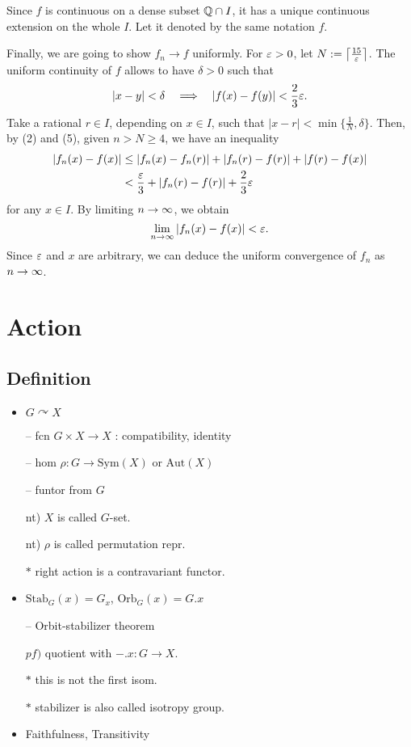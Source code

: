 \documentclass[11pt]{article}
\let\realsection\section
\renewcommand\section{\newpage\realsection}
\begin{document}
\begin{pf}
Since $f$ is continuous on a dense subset $\mathbb{Q}\cap I$, it has a unique continuous extension on the whole $I$.
Let it denoted by the same notation $f$.

\Step[4]
Finally, we are going to show $f_n\to f$ uniformly.
For $\varepsilon>0$, let $N:=\left\lceil\frac{15}{\varepsilon}\right\rceil$.
The uniform continuity of $f$ allows to have $\delta>0$ such that
\begin{align}|x-y|<\delta\impl|f(x)-f(y)|<\frac23\e.\end{align}
Take a rational $r\in I$, depending on $x\in I$, such that $|x-r|<\min\{\frac1N,\delta\}$.
Then, by (2) and (5), given $n>N\ge4$, we have an inequality
\begin{align*}
|f_n(x)-f(x)|&\le|f_n(x)-f_n(r)|+|f_n(r)-f(r)|+|f(r)-f(x)|\\
&<\frac{\varepsilon}3+|f_n(r)-f(r)|+\frac23\varepsilon
\end{align*}
for any $x\in I$.
By limiting $n\to\oo$, we obtain
\[\lim_{n\to\oo}|f_n(x)-f(x)|<\e.\]
Since $\varepsilon$ and $x$ are arbitrary, we can deduce the uniform convergence of $f_n$ as $n\to\oo$.
\end{pf}





\section{Action}

\subsection*{Definition}
\begin{itemize}
\item $G\curvearrowright X$
	\par-- fcn $G\times X\to X$ : compatibility, identity
	\par-- hom $\rho\colon G\to\text{Sym}(X)$ or $\text{Aut}(X)$
	\par-- funtor from $G$
	\par nt) $X$ is called $G$-set.
	\par nt) $\rho$ is called permutation repr.
	\par$*$ right action is a contravariant functor.
\item $\text{Stab}_G(x)=G_x$, $\text{Orb}_G(x)=G.x$
	\par-- Orbit-stabilizer theorem
		\par\quad$pf)$ quotient with $-.x\colon G\to X$.
		\par\quad$*$ this is not the first isom.
	\par$*$ stabilizer is also called isotropy group.
\item Faithfulness, Transitivity
\end{itemize}
\end{document}
